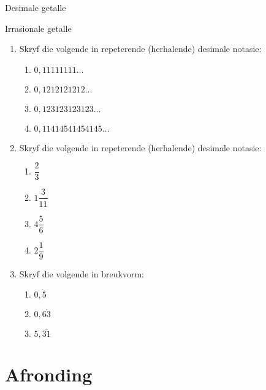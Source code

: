 \begin{Aktiwiteit}{Desimale getalle}
\begin{aktiwiteit}{Irrasionale getalle}
\begin{exercises}{}
{\begin{enumerate}[itemsep=5pt, label=\textbf{\arabic*}. ]
% 
\item Skryf die volgende in repeterende (herhalende) desimale notasie:
    \begin{enumerate}[itemsep=5pt, label=\textbf{\alph*}. ] 
    \item $0,11111111\ldots$
    \item $0,1212121212\ldots$
    \item $0,123123123123\ldots$
    \item $0,11414541454145\ldots$
    \end{enumerate}
\item Skryf die volgende in repeterende (herhalende) desimale notasie:
    \begin{enumerate}[itemsep=5pt, label=\textbf{\alph*}. ] 
    \item $\dfrac{2}{3}$
    \item $1\dfrac{3}{11}$
    \item $4\dfrac{5}{6}$
    \item $2\dfrac{1}{9}$
    \end{enumerate}
\item Skryf die volgende in breukvorm:
    \begin{enumerate}[itemsep=5pt, label=\textbf{\alph*}. ] 
    \item $0,\dot{5}$
    \item $0,6\dot{3}$
    \item $5,\overline{31}$
    \end{enumerate}
\end{enumerate}
}
\end{exercises}

\section{ Afronding}
\nopagebreak


\end{aktiwiteit}
\end{Aktiwiteit}
